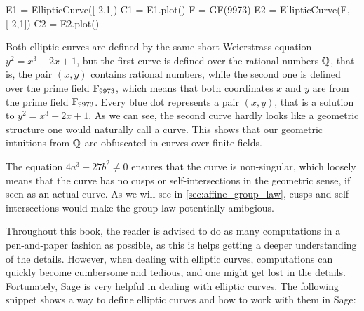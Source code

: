 \medskip

\begin{sagesilent}
E1 = EllipticCurve([-2,1])
C1 = E1.plot()
F = GF(9973)
E2 = EllipticCurve(F, [-2,1])
C2 = E2.plot()
\end{sagesilent}
\begin{minipage}{0.48\textwidth}
\end{minipage}
%
\begin{minipage}{0.48\textwidth}
\label{plot:elliptic_curve}
\end{minipage}

Both elliptic curves are defined by the same short Weierstrass equation $y^2 = x^3-2x+1$, but the first curve is defined over the rational numbers $\mathbb{Q}$, that is, the pair $(x,y)$ contains rational numbers, while the second one is defined over the prime field $\mathbb{F}_{9973}$, which means that both coordinates $x$ and $y$ are from the prime field $\mathbb{F}_{9973}$. Every blue dot represents a pair $(x,y)$, that is a solution to $y^2 = x^3-2x+1$. As we can see, the second curve hardly looks like a geometric structure one would naturally call a curve. This shows that our geometric intuitions from $\mathbb{Q}$ are obfuscated in curves over finite fields.

The equation $4a^3+ 27b^2\neq 0$ ensures that the curve is  non-singular, which loosely means that the curve has no cusps or self-intersections in the geometric sense, if seen as an actual curve. As we will see in \ref{sec:affine_group_law}, cusps and self-intersections would make the group law potentially amibgious.

Throughout this book, the reader is advised to do as many computations in a pen-and-paper fashion as possible, as this is helps getting a deeper understanding of the details. However, when dealing with elliptic curves, computations can quickly become cumbersome and tedious, and one might get lost in the details. Fortunately, Sage is very helpful in dealing with elliptic curves. The following snippet shows a way to define elliptic curves and how to work with them in Sage:

